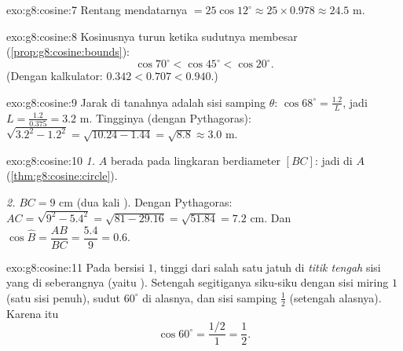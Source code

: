 \begin{solution}{exo:g8:cosine:7}
Rentang mendatarnya $= 25 \cos 12^\circ \approx 25 \times 0.978
\approx 24.5$ m.
\end{solution}

\begin{solution}{exo:g8:cosine:8}
Kosinusnya turun ketika sudutnya membesar
(\cref{prop:g8:cosine:bounds}):
\[
\cos 70^\circ < \cos 45^\circ < \cos 20^\circ .
\]
(Dengan kalkulator: $0.342 < 0.707 < 0.940$.)
\end{solution}

\begin{solution}{exo:g8:cosine:9}
Jarak di tanahnya adalah sisi samping $\theta$:
$\cos 68^\circ = \frac{1.2}{L}$, jadi
$L = \frac{1.2}{0.375} = 3.2$ m. Tingginya (dengan Pythagoras):
$\sqrt{3.2^2 - 1.2^2} = \sqrt{10.24 - 1.44} = \sqrt{8.8} \approx 3.0$
m.
\end{solution}

\begin{solution}{exo:g8:cosine:10}
\emph{1.} $A$ berada pada lingkaran berdiameter $[BC]$: jadi  di $A$ (\cref{thm:g8:cosine:circle}).

\emph{2.} $BC = 9$ cm (dua kali ). Dengan Pythagoras:
$AC = \sqrt{9^2 - 5.4^2} = \sqrt{81 - 29.16} = \sqrt{51.84} = 7.2$
cm. Dan $\cos\widehat B = \dfrac{AB}{BC} = \dfrac{5.4}{9} = 0.6$.
\end{solution}

\begin{solution}{exo:g8:cosine:11}
Pada  bersisi $1$, tinggi dari salah satu  jatuh di \emph{titik tengah} sisi yang di seberangnya (yaitu
). Setengah segitiganya siku-siku dengan sisi miring
$1$ (satu sisi penuh), sudut $60^\circ$ di  alasnya, dan
sisi samping $\frac12$ (setengah alasnya). Karena itu
\[
\cos 60^\circ = \frac{1/2}{1} = \frac12 .
\]
\end{solution}

